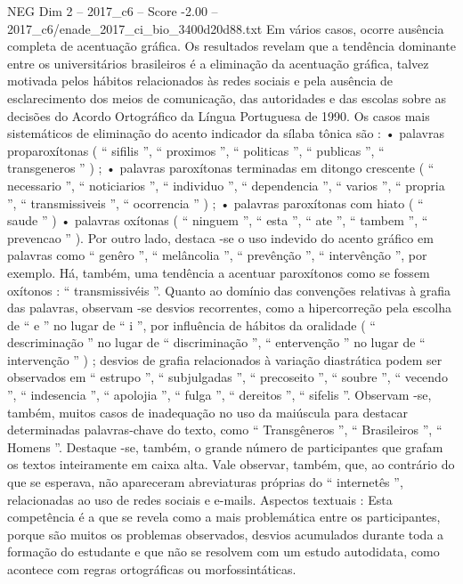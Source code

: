 \begin{textsample}{NEG Dim 2 – 2017\_c6 – Score -2.00 – 2017\_c6/enade\_2017\_ci\_bio\_3400d20d88.txt}
Em vários casos, ocorre ausência completa de acentuação gráfica.
Os resultados revelam que a tendência dominante entre os universitários brasileiros é a eliminação da acentuação gráfica, talvez motivada pelos hábitos relacionados às redes sociais e pela ausência de esclarecimento dos meios de comunicação, das autoridades e das escolas sobre as decisões do Acordo Ortográfico da Língua Portuguesa de 1990.
Os casos mais sistemáticos de eliminação do acento indicador da sílaba tônica são : • palavras proparoxítonas ( “ sifilis ”, “ proximos ”, “ politicas ”, “ publicas ”, “ transgeneros ” ) ; • palavras paroxítonas terminadas em ditongo crescente ( “ necessario ”, “ noticiarios ”, “ individuo ”, “ dependencia ”, “ varios ”, “ propria ”, “ transmissiveis ”, “ ocorrencia ” ) ; • palavras paroxítonas com hiato ( “ saude ” ) • palavras oxítonas ( “ ninguem ”, “ esta ”, “ ate ”, “ tambem ”, “ prevencao ” ).
Por outro lado, destaca -se o uso indevido do acento gráfico em palavras como “ genêro ”, “ melâncolia ”, “ prevênção ”, “ intervênção ”, por exemplo.
Há, também, uma tendência a acentuar paroxítonos como se fossem oxítonos : “ transmissivéis ”.
Quanto ao domínio das convenções relativas à grafia das palavras, observam -se desvios recorrentes, como a hipercorreção pela escolha de “ e ” no lugar de “ i ”, por influência de hábitos da oralidade ( “ descriminação ” no lugar de “ discriminação ”, “ entervenção ” no lugar de “ intervenção ” ) ; desvios de grafia relacionados à variação diastrática podem ser observados em “ estrupo ”, “ subjulgadas ”, “ precoseito ”, “ soubre ”, “ vecendo ”, “ indesencia ”, “ apolojia ”, “ fulga ”, “ dereitos ”, “ sifelis ”.
Observam -se, também, muitos casos de inadequação no uso da maiúscula para destacar determinadas palavras-chave do texto, como “ Transgêneros ”, “ Brasileiros ”, “ Homens ”.
Destaque -se, também, o grande número de participantes que grafam os textos inteiramente em caixa alta.
Vale observar, também, que, ao contrário do que se esperava, não apareceram abreviaturas próprias do “ internetês ”, relacionadas ao uso de redes sociais e e-mails.
Aspectos textuais : Esta competência é a que se revela como a mais problemática entre os participantes, porque são muitos os problemas observados, desvios acumulados durante toda a formação do estudante e que não se resolvem com um estudo autodidata, como acontece com regras ortográficas ou morfossintáticas.

\end{textsample}
